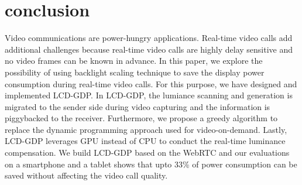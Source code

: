 \section{conclusion}
\label{sec:conclusion}
Video communications are power-hungry applications. Real-time video calls add additional challenges because real-time video calls are highly delay sensitive and no video frames can be known in advance. In this paper, we explore the possibility of using backlight scaling technique to save the display power consumption during real-time video calls. For this purpose, we have designed and implemented LCD-GDP. In LCD-GDP, the lumiance scanning and generation is migrated to the sender side during video capturing and the information is piggybacked to the receiver. Furthermore, we propose a greedy algorithm to replace the dynamic programming approach used for video-on-demand. Lastly, LCD-GDP leverages GPU instead of CPU to conduct the real-time luminance compensation. We build LCD-GDP based on the WebRTC and our evaluations on a smartphone and a tablet shows that upto 33\% of power consumption can be saved without affecting the video call quality.


